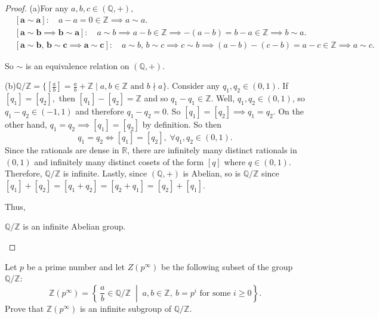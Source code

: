 \documentclass[addpoints,10pt]{exam}
\theoremstyle{plain}
\theoremstyle{definition}
\newtheorem{prob}[thm]{Problem}
\theoremstyle{plain}
\theoremstyle{plain}
\theoremstyle{definition}
\let\oldprob\prob
\let\endoldprob\endprob
\renewenvironment{prob}
  {\begin{singlespace}\oldprob}
  {\endoldprob\end{singlespace}}
\newcommand{\belowtitle}{\leavevmode\newline}
\newcommand{\QQ}{\ensuremath{\mathbb{Q}}}
\newcommand{\RR}{\ensuremath{\mathbb{R}}}
\newcommand{\ZZ}{\ensuremath{\mathbb{Z}}}
\begin{document}
\begin{proof}\belowtitle
    (a)\quad For any $a,b,c\in (\QQ,+),$
    \begin{align*}
        &\mathbf{[a\sim a]:}\quad a-a=0\in \ZZ \implies a\sim a.\\
        &\mathbf{[a\sim b\implies b\sim a]:}\quad a\sim b\implies a-b\in \ZZ \implies -(a-b)=b-a\in \ZZ\implies  b\sim a.\\
        &\mathbf{[a\sim b,\,b\sim c\implies a\sim c]:}\quad a\sim b,\,b\sim c\implies c\sim b\implies (a-b)-(c-b)=a-c\in \ZZ\implies a\sim c.
    \end{align*}

    So $\sim$ is an equivalence relation on $(\QQ,+)$.

    (b)\quad $\QQ/\ZZ=\{[\frac{a}{b}]=\frac{a}{b}+\ZZ \mid a,b\in \ZZ\text{ and }b\nmid a\}$. Consider any $q_{1},q_{2}\in (0,1)$. If $[q_{1}]=[q_{2}],$ then $[q_{1}]-[q_{2}]=\ZZ$ and so $q_{1}-q_{1}\in \ZZ$. Well, $q_{1},q_{2}\in (0,1)$, so $q_{1}-q_{2}\in (-1,1)$ and therefore $q_{1}-q_{2}=0$. So $[q_{1}]=[q_{2}]\implies q_{1}=q_{2}$. On the other hand, $q_{1}=q_{2}\implies [q_{1}]=[q_{2}]$ by definition. So then
    $$q_{1}=q_{2}\iff [q_{1}]=[q_{2}],\;\forall q_{1},q_{2}\in (0,1).$$
    Since the rationals are dense in $\RR$, there are infinitely many distinct rationals in $(0,1)$ and infinitely many distinct cosets of the form $[q]$ where $q\in (0,1)$. Therefore, $\QQ/\ZZ$ is infinite. Lastly, since $(\QQ,+)$ is Abelian, so is $\QQ/\ZZ$ since $[q_{1}]+[q_{2}]=[q_{1}+q_{2}]=[q_{2}+q_{1}]=[q_{2}]+[q_{1}]$.

    Thus,
    \begin{center}
    $\QQ/\ZZ$ is an infinite Abelian group.
    \end{center}
\end{proof}
\newpage
\begin{prob}
  Let $p$ be a prime number and let $Z(p^\infty)$ be the following subset of the group $\mathbb{Q}/\mathbb{Z}$:
  \[
  \ZZ(p^\infty)=\left\{\, \frac{a}{b} \in \mathbb{Q}/\mathbb{Z} \;\middle|\; a,b\in\mathbb{Z},\ b=p^i \text{ for some } i \ge 0 \right\}.
  \]
  Prove that $\ZZ(p^\infty)$ is an infinite subgroup of $\mathbb{Q}/\mathbb{Z}$.
\end{prob}
\end{document}
